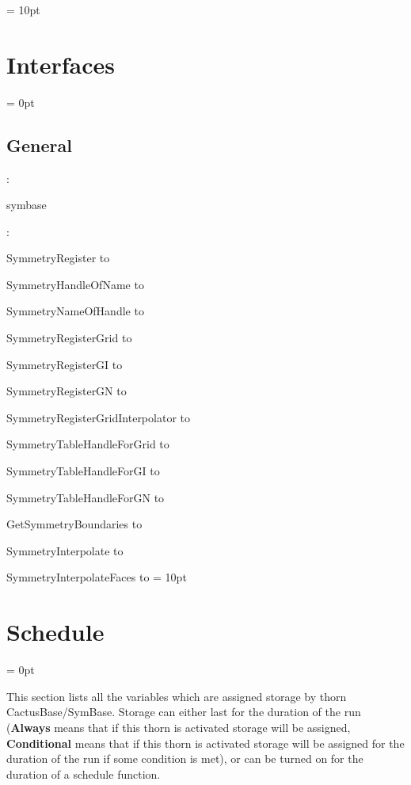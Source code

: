 \vspace{0.5cm}\parskip = 10pt 

\section{Interfaces} 


\parskip = 0pt

\vspace{3mm} \subsection*{General}

: 

symbase
\vspace{2mm}

\vspace{5mm}

: 



SymmetryRegister to 

SymmetryHandleOfName to 

SymmetryNameOfHandle to 

SymmetryRegisterGrid to 

SymmetryRegisterGI to 

SymmetryRegisterGN to 

SymmetryRegisterGridInterpolator to 

SymmetryTableHandleForGrid to 

SymmetryTableHandleForGI to 

SymmetryTableHandleForGN to 

GetSymmetryBoundaries to 

SymmetryInterpolate to 

SymmetryInterpolateFaces to 
\vspace{2mm}\parskip = 10pt 

\section{Schedule} 


\parskip = 0pt


\noindent This section lists all the variables which are assigned storage by thorn CactusBase/SymBase.  Storage can either last for the duration of the run ({\bf Always} means that if this thorn is activated storage will be assigned, {\bf Conditional} means that if this thorn is activated storage will be assigned for the duration of the run if some condition is met), or can be turned on for the duration of a schedule function.


